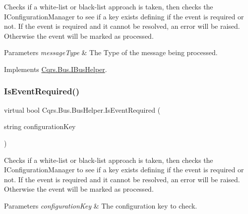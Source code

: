 Checks if a white-\/list or black-\/list approach is taken, then checks the I\+Configuration\+Manager to see if a key exists defining if the event is required or not. If the event is required and it cannot be resolved, an error will be raised. Otherwise the event will be marked as processed. 


\begin{DoxyParams}{Parameters}
{\em message\+Type} & The Type of the message being processed.\\
\hline
\end{DoxyParams}


Implements \hyperlink{interfaceCqrs_1_1Bus_1_1IBusHelper_acddf7635d6de08e3b09d552361fe4fda_acddf7635d6de08e3b09d552361fe4fda}{Cqrs.\+Bus.\+I\+Bus\+Helper}.

\mbox{\label{classCqrs_1_1Bus_1_1BusHelper_a60a9603d5c6b7f29ee42491475714895_a60a9603d5c6b7f29ee42491475714895}} 
\subsubsection{\texorpdfstring{Is\+Event\+Required()}{IsEventRequired()}\hspace{0.1cm}{\footnotesize\ttfamily [2/2]}}
{\footnotesize\ttfamily virtual bool Cqrs.\+Bus.\+Bus\+Helper.\+Is\+Event\+Required (\begin{DoxyParamCaption}\item[{string}]{configuration\+Key }\end{DoxyParamCaption})\hspace{0.3cm}{\ttfamily [virtual]}}



Checks if a white-\/list or black-\/list approach is taken, then checks the I\+Configuration\+Manager to see if a key exists defining if the event is required or not. If the event is required and it cannot be resolved, an error will be raised. Otherwise the event will be marked as processed. 


\begin{DoxyParams}{Parameters}
{\em configuration\+Key} & The configuration key to check.\\
\hline
\end{DoxyParams}


